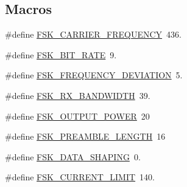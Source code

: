\subsection*{Macros}
\begin{DoxyCompactItemize}
\item 
\#define \hyperlink{group__defines__radio__non__ism__band__fsk__configuraiton_ga0c165cacd352a37567effed3f405492e}{F\+S\+K\+\_\+\+C\+A\+R\+R\+I\+E\+R\+\_\+\+F\+R\+E\+Q\+U\+E\+N\+CY}~436.
\item 
\#define \hyperlink{group__defines__radio__non__ism__band__fsk__configuraiton_ga0e39a8b8bddb39a81db0e1296f547f2d}{F\+S\+K\+\_\+\+B\+I\+T\+\_\+\+R\+A\+TE}~9.
\item 
\#define \hyperlink{group__defines__radio__non__ism__band__fsk__configuraiton_ga9bd34bff3c7ef520993a7d85973701ab}{F\+S\+K\+\_\+\+F\+R\+E\+Q\+U\+E\+N\+C\+Y\+\_\+\+D\+E\+V\+I\+A\+T\+I\+ON}~5.
\item 
\#define \hyperlink{group__defines__radio__non__ism__band__fsk__configuraiton_ga4776d889dbe10a9451f6f599301da027}{F\+S\+K\+\_\+\+R\+X\+\_\+\+B\+A\+N\+D\+W\+I\+D\+TH}~39.
\item 
\#define \hyperlink{group__defines__radio__non__ism__band__fsk__configuraiton_ga43a05b43583e7ca3f06ec418e80e0806}{F\+S\+K\+\_\+\+O\+U\+T\+P\+U\+T\+\_\+\+P\+O\+W\+ER}~20
\item 
\#define \hyperlink{group__defines__radio__non__ism__band__fsk__configuraiton_ga8e2bfafd0ea1783188ce2accaa282559}{F\+S\+K\+\_\+\+P\+R\+E\+A\+M\+B\+L\+E\+\_\+\+L\+E\+N\+G\+TH}~16
\item 
\#define \hyperlink{group__defines__radio__non__ism__band__fsk__configuraiton_ga0a39133f38cb54fb6fa6460518e84b38}{F\+S\+K\+\_\+\+D\+A\+T\+A\+\_\+\+S\+H\+A\+P\+I\+NG}~0.
\item 
\#define \hyperlink{group__defines__radio__non__ism__band__fsk__configuraiton_gac8f3dda4754cbba6b8912fc5653e597d}{F\+S\+K\+\_\+\+C\+U\+R\+R\+E\+N\+T\+\_\+\+L\+I\+M\+IT}~140.
\end{DoxyCompactItemize}


